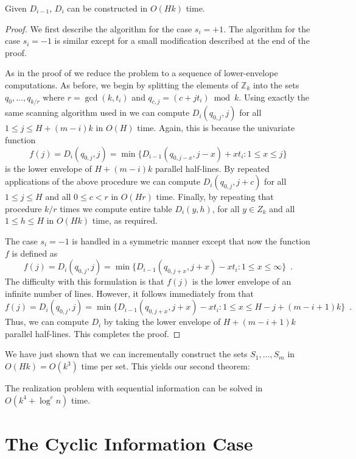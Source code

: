 \documentclass[11pt,a4paper]{article}
\newcommand{\Z}{\mathbb{Z}}
\begin{document}
\begin{lem}
Given $D_{i-1}$, $D_i$ can be constructed in $O(Hk)$ time.
\end{lem}

\begin{proof}
We first describe the algorithm for the case $s_i=+1$. The algorithm
for the case $s_i=-1$ is similar except for a small modification
described at the end of the proof.

As in the proof of  we reduce the problem to a 
sequence of lower-envelope
computations.   As before, we begin by
splitting the elements of $\Z_k$ into the sets
$q_{0},\ldots,q_{k/r}$ where $r=\gcd(k,t_i)$ and
$q_{c,j}=(c+jt_i)\bmod k$.
Using exactly the same scanning algorithm used in  we
can compute $D_i(q_{0,j},j)$ for all $1\le j\le H+(m-i)k$ in $O(H)$ time.
Again, this is because the univariate function
\[ f(j) = D_i(q_{0,j},j) = \min\{ D_{i-1}(q_{0,j-x},j-x) + xt_i : 1\le
x\le j\} 
\]
is the lower envelope of $H+(m-i)k$ parallel half-lines.
By repeated applications of the above procedure we can compute
$D_i(q_{0,j},j+c)$ for all $1\le j\le H$ and all
$0\le c< r$ in $O(Hr)$ time.  Finally, by repeating that
procedure $k/r$ times we compute entire table $D_i(y,h)$, for all
$y\in Z_k$ and all $1\le h\le H$ in $O(Hk)$ time, as required. 

The case $s_{i}=-1$ is handled in a symmetric manner except that now
the function $f$ is defined as
\[
  f(j) = D_{i}(q_{0,j},j) = \min\{D_{i-1}(q_{0,j+x},j+x) - xt_i :
1\le x\le \infty\} \enspace .
\]
The difficulty with this formulation is that $f(j)$ is the lower
envelope of an infinite number of lines.  However, it follows immediately from  that 
\[
  f(j) = D_{i}(q_{0,j},j) = \min\{D_{i-1}(q_{0,j+x},j+x) - xt_i :
1\le x\le H-j+(m-i+1)k\} \enspace .
\]
Thus, we can compute $D_i$ by taking the lower envelope of
$H+(m-i+1)k$ parallel half-lines.  This completes the proof.
\end{proof}

We have just shown that we can incrementally construct the sets
$S_1,\ldots,S_m$ in $O(Hk)=O(k^3)$ time per set.  This yields our
second theorem:

\begin{thm}
The realization problem with sequential information can be solved in
$O(k^4+\log^c n)$ time.
\end{thm}


\section{The Cyclic Information Case}
\end{document}
